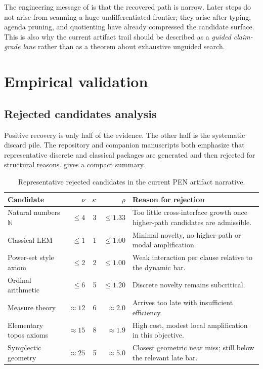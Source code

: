 \documentclass[pdflatex,sn-mathphys,Numbered]{sn-jnl}
\theoremstyle{thmstyleone}
\theoremstyle{thmstylethree}
\theoremstyle{thmstyletwo}
\newcommand{\N}{\mathbb{N}}
\begin{document}
The engineering message of  is that the recovered path is narrow. Later steps do not arise from scanning a huge undifferentiated frontier; they arise after typing, agenda pruning, and quotienting have already compressed the candidate surface. This is also why the current artifact trail should be described as a \emph{guided claim-grade lane} rather than as a theorem about exhaustive unguided search.

\section{Empirical validation}\label{sec:validation}

\subsection{Rejected candidates analysis}

Positive recovery is only half of the evidence. The other half is the systematic discard pile. The repository and companion manuscripts both emphasize that representative discrete and classical packages are generated and then rejected for structural reasons.  gives a compact summary.

\begin{table}[t]
\centering
\caption{Representative rejected candidates in the current PEN artifact narrative.}
\label{tab:rejected}
\footnotesize
\begin{tabular}{@{}p{2.55cm}r r r p{4.3cm}@{}}
\toprule
Candidate & $\nu$ & $\kappa$ & $\rho$ & Reason for rejection \\
\midrule
Natural numbers $\N$ & $\leq 4$ & 3 & $\leq 1.33$ & Too little cross-interface growth once higher-path candidates are admissible. \\
Classical LEM & $\leq 1$ & 1 & $\leq 1.00$ & Minimal novelty, no higher-path or modal amplification. \\
Power-set style axiom & $\leq 2$ & 2 & $\leq 1.00$ & Weak interaction per clause relative to the dynamic bar. \\
Ordinal arithmetic & $\leq 6$ & 5 & $\leq 1.20$ & Discrete novelty remains subcritical. \\
Measure theory & $\approx 12$ & 6 & $\approx 2.0$ & Arrives too late with insufficient efficiency. \\
Elementary topos axioms & $\approx 15$ & 8 & $\approx 1.9$ & High cost, modest local amplification in this objective. \\
Symplectic geometry & $\approx 25$ & 5 & $\approx 5.0$ & Closest geometric near miss; still below the relevant late bar. \\
\bottomrule
\end{tabular}
\end{table}
\end{document}
